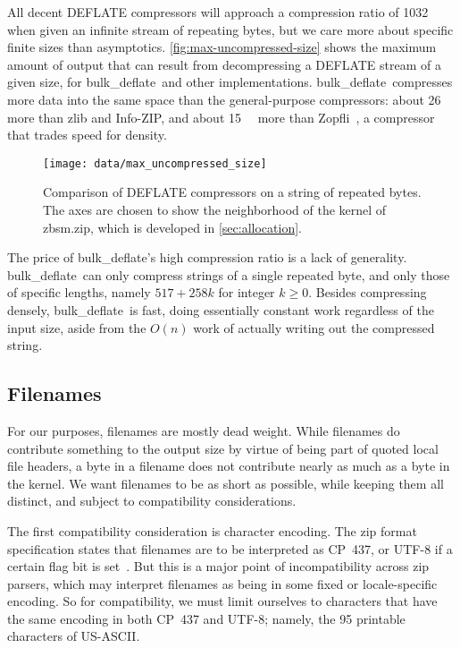 \documentclass[letterpaper,twocolumn,10pt]{article}
\newcommand{\kB}{\kilo\byte}
\newcommand{\bulkdeflate}{\mbox{bulk\_deflate}}
\begin{document}

All decent DEFLATE compressors will approach a compression ratio of \num{1032}
when given an infinite stream of repeating bytes,
but we care more about specific finite sizes
than asymptotics.
\autoref{fig:max-uncompressed-size} shows the
maximum amount of output
that can result from decompressing a DEFLATE stream of a given size,
for \bulkdeflate\ and other implementations.
\bulkdeflate\ compresses more data
into the same space than the general-purpose compressors:
about \SI{26}{\kB} more than zlib and Info-ZIP,
and about \SI{15}{\kB} more than Zopfli~\cite{zopfli},
a compressor that trades speed for density.

\begin{figure}
\texttt{[image: data/max\_uncompressed\_size]}
\caption{
Comparison of DEFLATE compressors
on a string of repeated bytes.
The axes are chosen to show the neighborhood
of the kernel of zbsm.zip, which is developed in \autoref{sec:allocation}.
}
\label{fig:max-uncompressed-size}
\end{figure}

The price of \bulkdeflate's high compression ratio is a lack of generality.
\bulkdeflate\ can only compress strings of a single repeated byte,
and only those of specific lengths,
namely $517 + 258 k$ for integer $k \ge 0$.
Besides compressing densely, \bulkdeflate\ is fast,
doing essentially constant work regardless of the input size,
aside from the $O(n)$ work of actually writing out the compressed string.

\subsection{Filenames}
\label{sec:filenames}

For our purposes, filenames are mostly dead weight.
While filenames do contribute something to the output size
by virtue of being part of quoted local file headers,
a byte in a filename does not contribute nearly as much
as a byte in the kernel.
We want filenames to be as short as possible,
while keeping them all distinct,
and subject to compatibility considerations.

The first compatibility consideration is character encoding.
The zip format specification states that filenames
are to be interpreted as CP~437,
or \mbox{UTF-8} if a certain flag bit is set~\cite[Appendix~D]{appnote}.
But this is a major point of incompatibility
across zip parsers,
which may interpret filenames as being in
some fixed or locale-specific encoding.
So for compatibility, we must limit ourselves to characters
that have the same encoding in both
CP~437 and \mbox{UTF-8};
namely, the \num{95} printable characters of \mbox{US-ASCII}.
\end{document}
